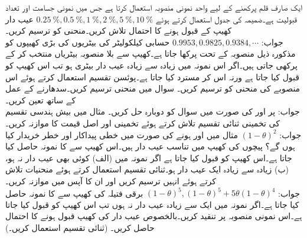 \quad
ایک صارف قلم پرکھنے کے لیے  واحد نمونی منصوبہ استعمال کرتا ہے جس  میں نمونی جسامت  اور  تعداد قبولیت  ہے۔ضمیمہ  کی جدول  استعمال کرتے ہوئے 
$\SI{0.25}{\percent},\SI{0.5}{\percent},\SI{1}{\percent},\SI{2}{\percent},\SI{5}{\percent},\SI{10}{\percent}$
عیب دار کھیپ کے قبول ہونے کا احتمال تلاش کریں۔منحنی  کو ترسیم کریں۔\\
جواب:\quad
$0.9953, 0.9825,0.9384,\cdots$
\quad
حسابی کیلکولیٹر کی بیٹریوں کی بڑی کھیپوں کو مذکورہ ذیل منصوبہ کے تحت پرکھا جاتا ہے۔کھیپ سے بلا منصوبہ  بیٹریاں منتخب کر کے پرکھی جاتی ہیں۔اگر اس نمونہ میں زیادہ سے زیادہ  عیب دار بیٹری ہو تب اس کھیپ کو قبول کیا جاتا ہے ورنہ اس کر مسترد کیا جاتا ہے۔پوئسن تقسیم استعمال کرتے ہوئے اس منصوبے کی  منحنی کو ترسیم کریں۔   
\quad
سوال  میں  منحنی ترسیم کریں۔سدھارنے کے عمل کے ساتھ  تعین کریں۔\\
جواب:\quad
{} پر 
\quad
{} اور  کی صورت میں سوال  کو دوبارہ حل کریں۔
\quad
مثال  میں بیش ہندسی تقسیم کی تخمینی ثنائی تقسیم تلاش کرتے ہوئے تخمینی اور اصل قیمت کا موازنہ کریں۔\\
جواب:\quad
$(1-\theta)^2$
\quad
مثال  میں   اور   ہونے کی صورت میں خطی پیداکار اور خطر خریدار کیا ہوں گے؟
\quad
پیچوں کی کھیپ میں  تناسب عیب دار ہیں۔اس کھیپ سے  کا نمونہ حاصل کیا جاتا ہے۔اس کھیپ کو قبول کیا جاتا ہے اگر نمونہ میں (الف) کوئی بھی عیب دار نہ ہو، (ب) زیادہ سے زیادہ ایک عیب دار ہو۔ثنائی تقسیم استعمال کرتے ہوئے   منحنیات تلاش کرتے ہوئے انہیں ترسیم کریں اور ان کا آپس میں موازنہ کریں۔\\
جواب:\quad
$(1-\theta)^5,(1-\theta)^5+5\theta(1-\theta)^4$
\quad
برقی فتیلہ کی کھیپ سے  کا نمونہ حاصل کیا جاتا ہے۔اگر نمونہ میں ایک سے زیادہ  عیب دار نہ ہوں تب اس کھیپ کو قبول کیا جاتا ہے۔اس نمونی منصوبہ پر تنقید کریں۔بالخصوص   عیب دار کی کھیپ قبول ہونے کا احتمال حاصل کریں۔ (ثنائی تقسیم استعمال کریں۔) 
